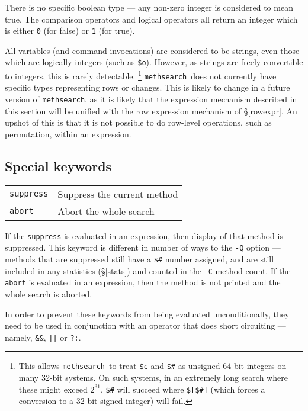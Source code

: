 \documentclass[a4paper,11pt,oneside]{book}
\makeatletter
\newcommand{\oi}[1]{\index{#1@{\hspace*{-\optwidth}\texttt{-}\texttt{#1}}}}
\newcommand{\fspec}[1]{\index{#1@{\hspace*{-\fspecwidth}\texttt{\$#1}}}}
\def\methsearch{\texttt{meth\-search}}
\newcommand{\sref}[1]{\hyperref[#1]{\S\ref{#1}}}
\makeatother
\begin{document}
There is no specific boolean type --- any non-zero
integer is considered to mean true.  The comparison operators and logical 
operators all return an integer which is either \verb+0+ (for false) or 
\verb+1+ (for true).

All variables (and command invocations) are considered to be strings,
even those which are logically integers (such as \verb+$o+).  However,
as strings are freely convertible to integers, this is rarely detectable.%
\footnote{This allows \methsearch\ to treat \verb+$c+\fspec{c} and \verb+$#+
as unsigned 64-bit integers on many 32-bit systems.  On such systems, 
in an extremely long search where these might exceed $2^{31}$, 
\verb+$#+ will succeed where \verb+$[$#]+ (which forces a conversion to a
32-bit signed integer) will fail.}
\methsearch\ does not currently have specific types representing rows or
changes.  This is likely to change in a future version of \methsearch, 
as it is likely that the expression mechanism described in this section will
be unified with the row expression mechanism of 
\sref{rowexpr}.  An upshot of this is that it is not possible to do row-level
operations, such as permutation, within an expression.

\subsection{Special keywords}\label{exprkey}

\begin{tabular}{ll}
\verb+suppress+& Suppress the current method\\
\verb+abort+&    Abort the whole search\\
\end{tabular}

If the \verb+suppress+
is evaluated in an expression, then display of that method is suppressed. 
This keyword is different in number of ways to the \verb+-Q+
option --- methods that are suppressed still have a \verb+$#+ number assigned,
and are still included in any statistics (\sref{stats}) and counted in the
\verb+-C+\oi{C} method count.
If the \verb+abort+ 
is evaluated in an expression, then the method is not printed and the
whole search is aborted.

In order to prevent these keywords from being evaluated unconditionally,
they need to be used in conjunction with an operator that does short circuiting%
 --- namely, \verb+&&+, \verb+||+ or 
\verb+?:+.
%
\end{document}
